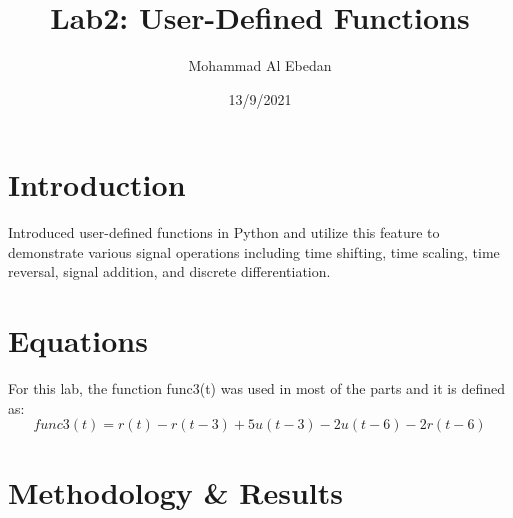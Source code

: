 \documentclass[11pt,a4]{Lab2 Report}
\title{Lab2: User-Defined Functions}
\author{Mohammad Al Ebedan}
\date{13/9/2021}
\begin{document}
	
	\section{Introduction}
	
	
	Introduced user-defined functions in Python and utilize this feature to demonstrate various signal operations including time shifting, time scaling, time reversal, signal addition, and discrete differentiation.
	
	\section{Equations}
	
	For this lab, the function func3(t) was used in most of the parts and it is defined as:
	\begin{equation}
		func3(t) = r(t) - r(t-3) + 5u(t-3) - 2u(t-6) - 2r(t-6)
	\end{equation}
	
	\section{Methodology & Results}
	
\end{document}
